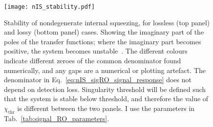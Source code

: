 \begin{figure}
    \centering
    \texttt{[image: nIS\_stability.pdf]}
    \caption{ Stability of nondegenerate internal squeezing, for lossless (top panel) and lossy (bottom panel) cases. Showing the imaginary part of the poles of the transfer functions; where the imaginary part becomes positive, the system becomes unstable~\cite{}. The different colours indicate different zeroes of the common denominator found numerically, and any gaps are a numerical or plotting artefact. The denominator in Eq.~\ref{eq:nIS_sigRO_signal_response} does not depend on detection loss. Singularity threshold will be defined such that the system is stable below threshold, and therefore the value of $\chi_\text{thr}$ is different between the two panels. I use the parameters in Tab.~\ref{tab:signal_RO_parameters}.}
    \label{fig:nIS_stability}
\end{figure}

